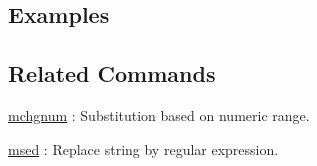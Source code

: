 \subsection*{Examples}

\subsection*{Related Commands}
\hyperref[sect:mchgnum]{mchgnum} : Substitution based on numeric range. 

\hyperref[sect:msed]{msed} : Replace string by regular expression. 

%
